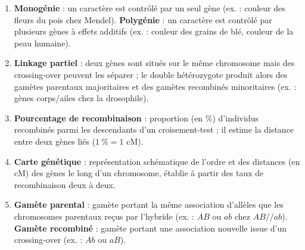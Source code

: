 \documentclass[11pt]{article}
\begin{document}
\begin{corrige}
\begin{enumerate}
\item \textbf{Monogénie} : un caractère est contrôlé par un seul gène (ex. : couleur des fleurs du pois chez Mendel). \textbf{Polygénie} : un caractère est contrôlé par plusieurs gènes à effets additifs (ex. : couleur des grains de blé, couleur de la peau humaine).
\item \textbf{Linkage partiel} : deux gènes sont situés sur le même chromosome mais des crossing-over peuvent les séparer ; le double hétérozygote produit alors des gamètes parentaux majoritaires et des gamètes recombinés minoritaires (ex. : gènes corps/ailes chez la drosophile).
\item \textbf{Pourcentage de recombinaison} : proportion (en \%) d'individus recombinés parmi les descendants d'un croisement-test ; il estime la distance entre deux gènes liés ($1~\% = 1$ cM).
\item \textbf{Carte génétique} : représentation schématique de l'ordre et des distances (en cM) des gènes le long d'un chromosome, établie à partir des taux de recombinaison deux à deux.
\item \textbf{Gamète parental} : gamète portant la même association d'allèles que les chromosomes parentaux reçus par l'hybride (ex. : $AB$ ou $ab$ chez $AB//ab$). \textbf{Gamète recombiné} : gamète portant une association nouvelle issue d'un crossing-over (ex. : $Ab$ ou $aB$).
\end{enumerate}
\end{corrige}
\end{document}

